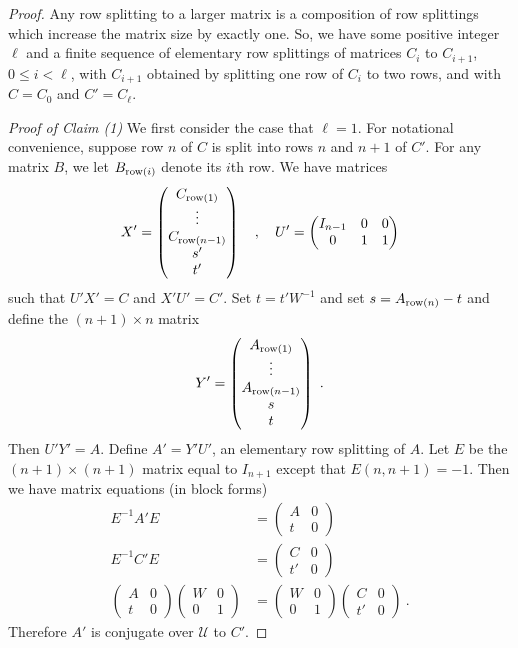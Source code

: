 \documentclass{amsart}
\theoremstyle{definition}
\theoremstyle{remark}
\numberwithin{equation}{section}
\begin{document}
{{\begin{proof} 
Any row splitting to a larger matrix 
is a composition of row splittings which 
increase the matrix size by exactly one.  
So, we have some positive integer $\ell$ and 
a finite sequence of elementary row splittings 
of matrices $C_i $ to $C_{i+1}$,  $0\leq i < \ell$, 
with $C_{i+1}$ obtained by splitting one row of $C_i$ to two rows, 
and with $C=C_0$ and $C'=C_{\ell}$.  

{\it Proof of Claim (1)} 
We first consider the case that $\ell = 1$. 
For notational convenience, suppose row $n$ of $C$ is split 
into rows $n$ and $n+1$ of $C'$. For any matrix $B$, we let 
$B_{\textnormal{row}(i)}$ 
 denote its $i$th row. We have matrices 
\[
X' = \begin{pmatrix} C_{\textnormal{row}(1)}\\ \vdots 
\\C_{\textnormal{row}(n-1)} \\ s' \\t' 
\end{pmatrix} \quad , \quad 
U' = \begin{pmatrix} I_{n-1} & 0 & 0 \\ 0 & 1 & 1 
\end{pmatrix} 
\] 
such that $U'X'=C$ and $X'U'=C'$. Set $t = t'W^{-1}$ and 
set $s= A_{\textnormal{row}(n)}-t$ and define the $(n+1)\times n$ matrix 
\[
Y' = 
\begin{pmatrix} A_{\textnormal{row}(1)}\\ \vdots \\A_{\textnormal{row}(n-1)} \\ s \\t 
\end{pmatrix}\ . 
\] 
Then $U'Y'=A$. Define $A'= Y'U'$, an elementary row splitting of $A$. 
Let $E$ be the $(n+1)\times (n+1)$ matrix equal to $I_{n+1}$ except that  
$E(n,n+1)=-1$.  Then we have matrix equations (in block forms) 
\begin{align*} 
E^{-1}A'E 
&= 
\begin{pmatrix} A & 0 \\ t & 0 \end{pmatrix}  \\
E^{-1}C'E 
& = 
\begin{pmatrix} C & 0 \\ t' & 0 \end{pmatrix} \\ 
\begin{pmatrix} A & 0 \\ t & 0 \end{pmatrix}  
\begin{pmatrix} W & 0 \\ 0 & 1 \end{pmatrix} 
&= 
\begin{pmatrix} W & 0 \\ 0 & 1 \end{pmatrix} 
\begin{pmatrix} C & 0 \\ t' & 0 \end{pmatrix} \ . 
\end{align*}  
Therefore $A'$ is conjugate over $\mathcal U$ to $C'$. 


\end{proof}}}
\end{document}
